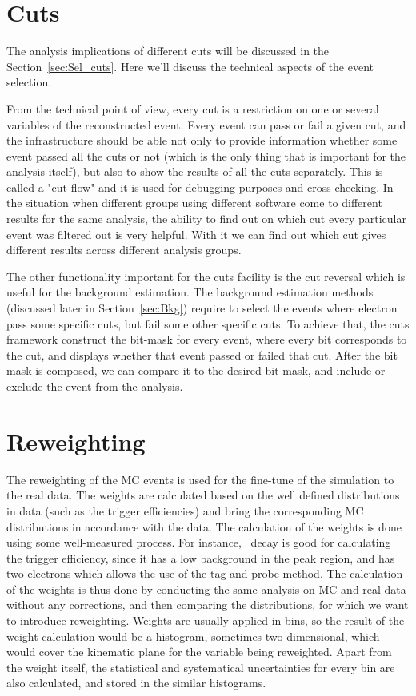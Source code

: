 \section{Cuts}

The analysis implications of different cuts will be discussed in the Section~\ref{sec:Sel_cuts}. Here we'll discuss the technical aspects of the event selection.

From the technical point of view, every cut is a restriction on one or several variables of the reconstructed event. Every event can pass or fail a given cut, and the infrastructure should be able not only to provide information whether some event passed all the cuts or not (which is the only thing that is important for the analysis itself), but also to show the results of all the cuts separately. This is called a "cut-flow" and it is used for debugging purposes and cross-checking. In the situation when different groups using different software come to different results for the same analysis, the ability to find out on which cut every particular event was filtered out is very helpful. With it we can find out which cut gives different results across different analysis groups.

The other functionality important for the cuts facility is the cut reversal which is useful for the background estimation. The background estimation methods (discussed later in Section~\ref{sec:Bkg}) require to select the events where electron pass some specific cuts, but fail some other specific cuts. To achieve that, the cuts framework construct the bit-mask for every event, where every bit corresponds to the cut, and displays whether that event passed or failed that cut. After the bit mask is composed, we can compare it to the desired bit-mask, and include or exclude the event from the analysis.

\section{Reweighting}

The reweighting of the MC events is used for the fine-tune of the simulation to the real data. The weights are calculated based on the well defined distributions in data (such as the trigger efficiencies) and bring the corresponding MC distributions in accordance with the data. The calculation of the weights is done using some well-measured process. For instance, \Zee\ decay is good for calculating the trigger efficiency, since it has a low background in the peak region, and has two electrons which allows the use of the tag and probe method. The calculation of the weights is thus done by conducting the same analysis on MC and real data without any corrections, and then comparing the distributions, for which we want to introduce reweighting. Weights are usually applied in bins, so the result of the weight calculation would be a histogram, sometimes two-dimensional, which would cover the kinematic plane for the variable being reweighted. Apart from the weight itself, the statistical and systematical uncertainties for every bin are also calculated, and stored in the similar histograms.

